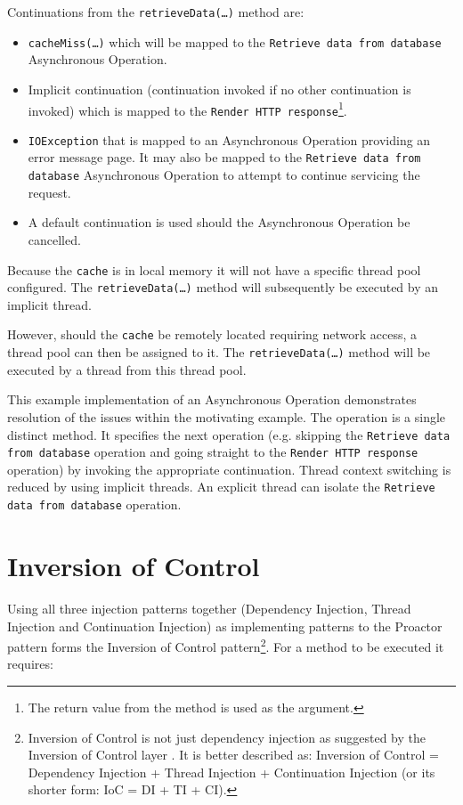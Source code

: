 \documentclass[prodmode]{style/acmlarge}
\begin{document}
Continuations from the \texttt{retrieveData(\ldots)} method are:
\begin{itemize}
  \item \texttt{cacheMiss(\ldots)} which will be mapped to the \texttt{Retrieve data from database} Asynchronous Operation.
  \item Implicit continuation (continuation invoked if no other continuation is invoked) which is mapped to the \texttt{Render HTTP response}\footnote{The return value from the method is used as the argument.}.
  \item \texttt{IOException} that is mapped to an Asynchronous Operation providing an error message page.  It may also be mapped to the \texttt{Retrieve data from database} Asynchronous Operation to attempt to continue servicing the request.
  \item A default continuation is used should the Asynchronous Operation be cancelled.
\end{itemize}

Because the \texttt{cache} is in local memory it will not have a specific thread
pool configured.  The \texttt{retrieveData(\ldots)} method will subsequently be
executed by an implicit thread.

However, should the \texttt{cache} be remotely located requiring network access,
a thread pool can then be assigned to it.  The \texttt{retrieveData(\ldots)}
method will be executed by a thread from this thread pool.

This example implementation of an Asynchronous Operation demonstrates resolution
of the issues within the motivating example.  The operation is a single distinct
method.  It specifies the next operation (e.g. skipping the \texttt{Retrieve
data from database} operation and going straight to the \texttt{Render HTTP
response} operation) by invoking the appropriate continuation.  Thread context
switching is reduced by using implicit threads.  An explicit thread can isolate the
\texttt{Retrieve data from database} operation.


\section{Inversion of Control}

Using all three injection patterns together (Dependency Injection, Thread
Injection and Continuation Injection) as implementing patterns to the Proactor
pattern forms the Inversion of Control pattern\footnote{Inversion of Control is
not just dependency injection as suggested by the Inversion of Control layer
\cite{ioc}.  It is better described as: Inversion of Control = Dependency
Injection + Thread Injection + Continuation Injection (or its shorter form: IoC
= DI + TI + CI).}.  For a method to be executed it requires:
\end{document}
